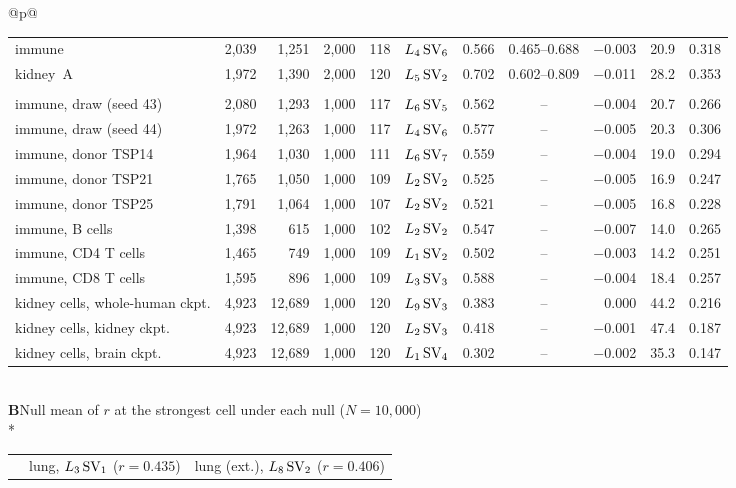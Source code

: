 \begin{longtable}{@{}p{\textwidth}@{}}
{\begin{tabular*}{\textwidth}{@{\extracolsep{\fill}}lrrrrlrcrrr@{}}
immune & 2,039 & 1,251 & 2,000 & 118 & $L_{4}\,\mathrm{SV}_{6}$ & 0.566 & 0.465--0.688 & $-$0.003 & 20.9 & 0.318 \\
kidney~A & 1,972 & 1,390 & 2,000 & 120 & $L_{5}\,\mathrm{SV}_{2}$ & 0.702 & 0.602--0.809 & $-$0.011 & 28.2 & 0.353 \\
\addlinespace[2pt]\multicolumn{11}{@{}l}{\itshape Robustness extractions (MS, $N = 1{,}000$)}\\
immune, draw (seed 43) & 2,080 & 1,293 & 1,000 & 117 & $L_{6}\,\mathrm{SV}_{5}$ & 0.562 & -- & $-$0.004 & 20.7 & 0.266 \\
immune, draw (seed 44) & 1,972 & 1,263 & 1,000 & 117 & $L_{4}\,\mathrm{SV}_{6}$ & 0.577 & -- & $-$0.005 & 20.3 & 0.306 \\
immune, donor TSP14 & 1,964 & 1,030 & 1,000 & 111 & $L_{6}\,\mathrm{SV}_{7}$ & 0.559 & -- & $-$0.004 & 19.0 & 0.294 \\
immune, donor TSP21 & 1,765 & 1,050 & 1,000 & 109 & $L_{2}\,\mathrm{SV}_{2}$ & 0.525 & -- & $-$0.005 & 16.9 & 0.247 \\
immune, donor TSP25 & 1,791 & 1,064 & 1,000 & 107 & $L_{2}\,\mathrm{SV}_{2}$ & 0.521 & -- & $-$0.005 & 16.8 & 0.228 \\
immune, B cells & 1,398 & 615 & 1,000 & 102 & $L_{2}\,\mathrm{SV}_{2}$ & 0.547 & -- & $-$0.007 & 14.0 & 0.265 \\
immune, CD4 T cells & 1,465 & 749 & 1,000 & 109 & $L_{1}\,\mathrm{SV}_{2}$ & 0.502 & -- & $-$0.003 & 14.2 & 0.251 \\
immune, CD8 T cells & 1,595 & 896 & 1,000 & 109 & $L_{3}\,\mathrm{SV}_{3}$ & 0.588 & -- & $-$0.004 & 18.4 & 0.257 \\
kidney cells, whole-human ckpt. & 4,923 & 12,689 & 1,000 & 120 & $L_{9}\,\mathrm{SV}_{3}$ & 0.383 & -- & 0.000 & 44.2 & 0.216 \\
kidney cells, kidney ckpt. & 4,923 & 12,689 & 1,000 & 120 & $L_{2}\,\mathrm{SV}_{3}$ & 0.418 & -- & $-$0.001 & 47.4 & 0.187 \\
kidney cells, brain ckpt. & 4,923 & 12,689 & 1,000 & 120 & $L_{1}\,\mathrm{SV}_{4}$ & 0.302 & -- & $-$0.002 & 35.3 & 0.147 \\
\end{tabular*}}\\
\midrule
\textbf{B}\enspace Null mean of $r$ at the strongest cell under each null ($N = 10{,}000$)\\*
{\scriptsize\begin{tabular*}{\textwidth}{@{\extracolsep{\fill}}lrrrrrrrr@{}}
& \multicolumn{4}{c}{lung, $L_3\,\mathrm{SV}_{1}$ ($r = 0.435$)} & \multicolumn{4}{c}{lung (ext.), $L_8\,\mathrm{SV}_{2}$ ($r = 0.406$)} \\

\end{tabular*}}
\end{longtable}
